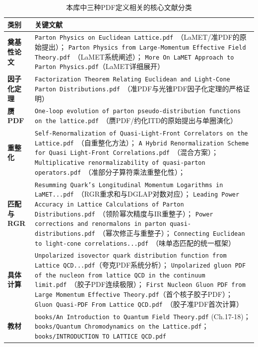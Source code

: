 \documentclass[12pt,a4paper]{ctexart}
\theoremstyle{definition}
\begin{document}
\begin{table}[H]
\centering
\caption{本库中三种PDF定义相关的核心文献分类}
\label{tab:three_pdfs_papers}
\small
\begin{tabular}{lp{8cm}}
\toprule
类别 & 关键文献 \\
\midrule
\textbf{奠基性论文} &
\texttt{Parton Physics on Euclidean Lattice.pdf}~\cite{Ji2013Euclidean}（LaMET/准PDF的原始提出）；
\texttt{Parton Physics from Large-Momentum Effective Field Theory.pdf}~\cite{Ji2014LaMET}（LaMET系统阐述）；
\texttt{More On LaMET Approach to Parton Physics.pdf}（LaMET详细展开） \\
\textbf{因子化定理} &
\texttt{Factorization Theorem Relating Euclidean and Light-Cone Parton Distributions.pdf}~\cite{Izubuchi2018}（准PDF与光锥PDF因子化定理的严格证明） \\
\textbf{赝PDF} &
\texttt{One-loop evolution of parton pseudo-distribution functions on the lattice.pdf}~\cite{Radyushkin2018oneLoop}（赝PDF/约化ITD的原始提出与单圈演化） \\
\textbf{重整化} &
\texttt{Self-Renormalization of Quasi-Light-Front Correlators on the Lattice.pdf}~\cite{Huo2021self}（自重整化方法）；
\texttt{A Hybrid Renormalization Scheme for Quasi Light-Front Correlations.pdf}~\cite{Ji2021hybrid}（混合方案）；
\texttt{Multiplicative renormalizability of quasi-parton operators.pdf}~\cite{Li2019multiplicative}（准部分子算符乘法重整化性）；\\
\textbf{匹配与RGR} &
\texttt{Resumming Quark's Longitudinal Momentum Logarithms in LaMET...pdf}~\cite{Su2023RGR}（RGR重求和与DGLAP对数对应）；
\texttt{Leading Power Accuracy in Lattice Calculations of Parton Distributions.pdf}~\cite{Zhang2023leadingPower}（领阶幂次精度与IR重整子）；
\texttt{Power corrections and renormalons in parton quasi-distributions.pdf}~\cite{Braun2019power}（幂次修正与重整子）；
\texttt{Connecting Euclidean to light-cone correlations...pdf}~\cite{Yao2023connecting}（味单态匹配的统一框架） \\
\textbf{具体计算} &
\texttt{Unpolarized isovector quark distribution function from Lattice QCD...pdf}（夸克PDF系统分析）；
\texttt{Unpolarized gluon PDF of the nucleon from lattice QCD in the continuum limit.pdf}~\cite{Chen2025gluon}（胶子PDF连续极限）；
\texttt{First Nucleon Gluon PDF from Large Momentum Effective Theory.pdf}（首个核子胶子PDF）；
\texttt{Gluon Quasi-PDF From Lattice QCD.pdf}~\cite{Fan2018gluonQuasi}（胶子准PDF首次计算） \\
\textbf{教材} &
\texttt{books/An Introduction to Quantum Field Theory.pdf} (Ch.17-18)；
\texttt{books/Quantum Chromodynamics on the Lattice.pdf}；
\texttt{books/INTRODUCTION TO LATTICE QCD.pdf} \\
\bottomrule
\end{tabular}
\end{table}
\end{document}
